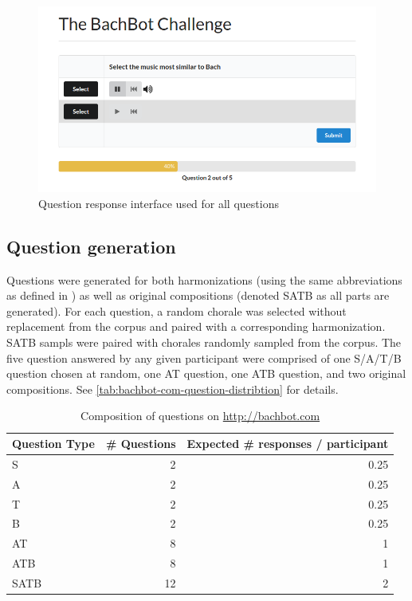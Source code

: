 \documentclass[dissertation.tex]{subfiles}
\begin{document}
\begin{figure}[htpb]
  \centering
  \includegraphics[width=1.0\linewidth]{Figures/question-screen.png}
  \caption{Question response interface used for all questions}
  \label{fig:question-screen}
\end{figure}

\subsection{Question generation}

Questions were generated for both harmonizations (using the same abbreviations
as defined in ) as well as original compositions (denoted SATB as all parts
are generated). For each question, a random chorale was selected without
replacement from the corpus and paired with a corresponding harmonization.
SATB sampls were paired with chorales randomly sampled from the corpus. The
five question answered by any given participant were comprised of one S/A/T/B
question chosen at random, one AT question, one ATB question, and two original
compositions. See
\autoref{tab:bachbot-com-question-distribtion} for details.

\begin{table}[htpb]
  \centering
  \begin{tabular}{lrr}
    \toprule
    Question Type & \# Questions &  Expected \# responses / participant \\
    \midrule
    S        & 2  & 0.25 \\
    A        & 2  & 0.25 \\
    T        & 2  & 0.25 \\
    B        & 2  & 0.25 \\
    AT       & 8  & 1 \\
    ATB      & 8  & 1 \\
    SATB     & 12 & 2 \\
    \bottomrule
  \end{tabular}
  \caption{Composition of questions on \url{http://bachbot.com}}
  \label{tab:bachbot-com-question-distribtion}
\end{table}
\end{document}
